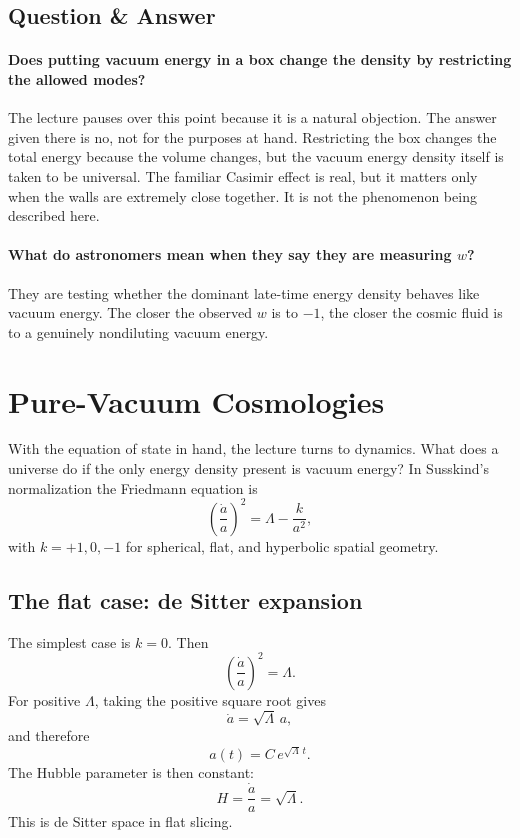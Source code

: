 \subsection{Question \& Answer}

\paragraph{Does putting vacuum energy in a box change the density by restricting the allowed modes?} The lecture pauses over this point because it is a natural objection. The answer given there is no, not for the purposes at hand. Restricting the box changes the total energy because the volume changes, but the vacuum energy density itself is taken to be universal. The familiar Casimir effect is real, but it matters only when the walls are extremely close together. It is not the phenomenon being described here.

\paragraph{What do astronomers mean when they say they are measuring \(w\)?} They are testing whether the dominant late-time energy density behaves like vacuum energy. The closer the observed \(w\) is to \(-1\), the closer the cosmic fluid is to a genuinely nondiluting vacuum energy.

\section{Pure-Vacuum Cosmologies}

With the equation of state in hand, the lecture turns to dynamics. What does a universe do if the only energy density present is vacuum energy? In Susskind's normalization the Friedmann equation is
\begin{equation}
\left(\frac{\dot a}{a}\right)^2=\Lambda-\frac{k}{a^2},
\end{equation}
with \(k=+1,0,-1\) for spherical, flat, and hyperbolic spatial geometry.

\subsection{The flat case: de Sitter expansion}

The simplest case is \(k=0\). Then
\begin{equation}
\left(\frac{\dot a}{a}\right)^2=\Lambda.
\end{equation}
For positive \(\Lambda\), taking the positive square root gives
\begin{equation}
\dot a=\sqrt{\Lambda}\,a,
\end{equation}
and therefore
\begin{equation}
a(t)=C\,e^{\sqrt{\Lambda}\,t}.
\end{equation}
The Hubble parameter is then constant:
\begin{equation}
H=\frac{\dot a}{a}=\sqrt{\Lambda}.
\end{equation}
This is de Sitter space in flat slicing.

